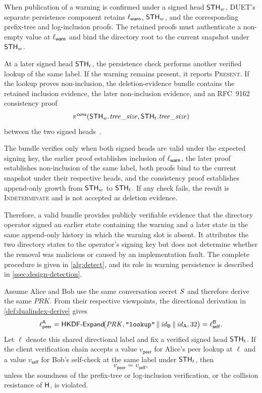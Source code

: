 \begin{definition}\label{def:deletion-evidence}
When publication of a warning is confirmed under a signed head $\mathsf{STH}_w$, DUET's separate
persistence component retains $\ell_{\mathsf{warn}}$, $\mathsf{STH}_w$, and the corresponding prefix-tree and
log-inclusion proofs. The retained proofs must authenticate a non-empty value at $\ell_{\mathsf{warn}}$ and
bind the directory root to the current snapshot under $\mathsf{STH}_w$.

At a later signed head $\mathsf{STH}_t$, the persistence check performs another verified lookup of the same
label. If the warning remains present, it reports \textsc{Present}. If the lookup proves
non-inclusion, the deletion-evidence bundle contains the retained inclusion evidence, the later
non-inclusion evidence, and an RFC~9162 consistency proof
\[
\pi^{\mathsf{cons}}\!\left(
\mathsf{STH}_w.\mathit{tree\_size},
\mathsf{STH}_t.\mathit{tree\_size}
\right)
\]
between the two signed heads~\cite{rfc9162}.

The bundle verifies only when both signed heads are valid under the expected signing key, the
earlier proof establishes inclusion of $\ell_{\mathsf{warn}}$, the later proof establishes non-inclusion of the
same label, both proofs bind to the current snapshot under their respective heads, and the
consistency proof establishes append-only growth from $\mathsf{STH}_w$ to $\mathsf{STH}_t$. If any check fails, the
result is \textsc{Indeterminate} and is not accepted as deletion evidence.

Therefore, a valid bundle provides publicly verifiable evidence that the directory operator signed
an earlier state containing the warning and a later state in the same append-only history in which
the warning slot is absent. It attributes the two directory states to the operator's signing key
but does not determine whether the removal was malicious or caused by an implementation fault. The
complete procedure is given in \cref{alg:detect}, and its role in warning persistence is described
in \cref{ssec:design-detection}.
\end{definition}

\begin{lemma}\label{lem:dualindex-consistency}
Assume Alice and Bob use the same conversation secret $S$ and therefore derive the same
$\mathit{PRK}$. From their respective viewpoints, the directional derivation in
\cref{def:dualindex-derive} gives
\[
\ell^{\mathsf{A}}_{\mathsf{peer}}
=
\mathsf{HKDF\text{-}Expand}\!\bigl(
\mathit{PRK},
\text{\texttt{"lookup"}}\,\|\,
\mathit{id}_{\mathsf{B}}\,\|\,
\mathit{id}_{\mathsf{A}},
32
\bigr)
=
\ell^{\mathsf{B}}_{\mathsf{self}}.
\]
Let $\ell$ denote this shared directional label and fix a verified signed head $\mathsf{STH}_t$. If the
client verification chain accepts a value $v_{\mathsf{peer}}$ for Alice's peer lookup at $\ell$ and
a value $v_{\mathsf{self}}$ for Bob's self-check at the same label under $\mathsf{STH}_t$, then
\[
v_{\mathsf{peer}}=v_{\mathsf{self}},
\]
unless the soundness of the prefix-tree or log-inclusion verification, or the collision resistance
of $\mathsf{H}$, is violated.
\end{lemma}

